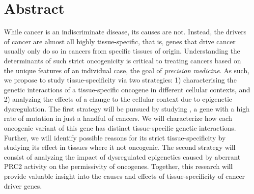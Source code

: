 \chapter{Abstract}
\normalsize

While cancer is an indiscriminate disease, its causes are not. 
Instead, the drivers of cancer are almost all highly tissue-specific, that is, genes that drive cancer usually only do so in cancers from specific tissues of origin.
Understanding the determinants of such strict oncogenicity is critical to treating cancers based on the unique features of an individual case, the goal of \emph{precision medicine}.
As such, we propose to study tissue-specificity via two strategies: 1) characterising the genetic interactions of a tissue-specific oncogene in different cellular contexts, and 2) analyzing the effects of a change to the cellular context due to epigenetic dysregulation.
The first strategy will be pursued by studying \KRAS{}, a gene with a high rate of mutation in just a handful of cancers.
We will characterize how each oncogenic variant of this gene has distinct tissue-specific genetic interactions.
Further, we will identify possible reasons for its strict tissue-specificity by studying its effect in tissues where it not oncogenic.
The second strategy will consist of analyzing the impact of dysregulated epigenetics caused by aberrant PRC2 activity on the permissivity of oncogenes.
Together, this research will provide valuable insight into the causes and effects of tissue-specificity of cancer driver genes.

